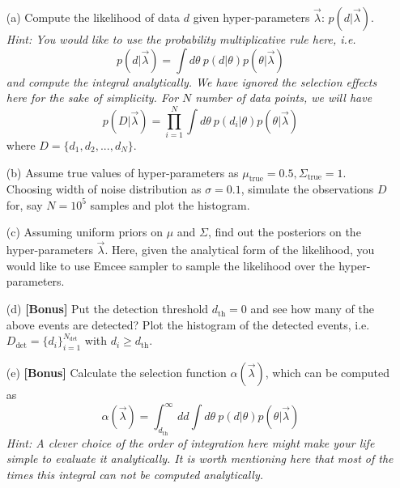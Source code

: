 \documentclass{article} %
\begin{document}
    \begin{enumerate}
        \item[(a)] Compute the likelihood of data $d$ given hyper-parameters $\Vec{\lambda}$: $p(d|\Vec{\lambda})$.
    \textit{Hint: You would like to use the probability multiplicative rule here, i.e.}
    \begin{equation}
        p(d|\Vec{\lambda}) =  \int d\theta \ p(d|\theta) p(\theta|\Vec{\lambda})
    \end{equation}
    \textit{and compute the integral analytically. We have ignored the selection effects here for the sake of simplicity. For $N$ number of data points, we will have}
    \begin{equation}
        p(D|\Vec{\lambda}) =  \prod_{i=1}^{N}\int d \theta \ p(d_i|\theta) p(\theta|\Vec{\lambda})
    \end{equation}
    where $D = \{d_1, d_2, ..., d_N\}$.
    
    \item[(b)] Assume true values of hyper-parameters as $\mu_{\mathrm{true}} = 0.5, \Sigma_{\mathrm{true}} = 1$. Choosing width of noise distribution as $\sigma = 0.1$, simulate the observations $D$ for, say $N=10^5$ samples and plot the histogram.
    
    \item[(c)] Assuming uniform priors on $\mu$ and $\Sigma$, find out the posteriors on the hyper-parameters $\Vec{\lambda}$. Here, given the analytical form of the likelihood, you would like to use Emcee sampler to sample the likelihood over the hyper-parameters.

    \item[(d)] \textbf{[Bonus]} Put the detection threshold $d_\mathrm{th} = 0$ and see how many of the above events are detected? Plot the histogram of the detected events, i.e. $D_{\mathrm{det}} = \{ d_i\}_{i=1}^{N_{\mathrm{det}}}$ with $d_i \geq d_{\mathrm{th}}$.
    
    \item[(e)] \textbf{[Bonus]} Calculate the selection function $\alpha(\Vec{\lambda})$, which can be computed as
    \begin{equation}
        \alpha(\Vec{\lambda}) = \int_{d_{\mathrm{th}}}^\infty d d \int d\theta \ p(d|\theta) p(\theta|\Vec{\lambda})
    \end{equation}
    \textit{Hint: A clever choice of the order of integration here might make your life simple to evaluate it analytically. It is worth mentioning here that most of the times this integral can not be computed analytically.}
    

\end{enumerate}
\end{document}
